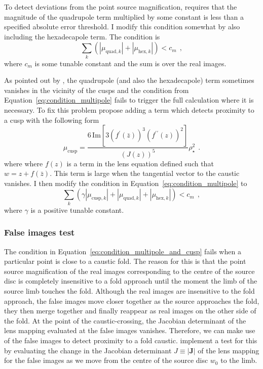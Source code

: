 \documentclass[12pt,dvipsnames]{report}
\renewcommand{\vec}[1]{\boldsymbol{\mathbf{#1}}}
\newcommand{\hquad}{~~}
\begin{document}
To detect deviations from the point source magnification, 
\citet{2018MNRAS.479.5157B} requires that the magnitude of the quadrupole term multiplied 
by some constant is less than a specified absolute error threshold. I modify this condition
somewhat by also including the hexadecapole term. The condition is  
\begin{equation}
    \sum_k\left(|\mu_{\mathrm{quad},k}| + |\mu_{\mathrm{hex},k}| \right)<c_m
    \hquad,
    \label{eq:condition_multipole}
\end{equation}
where $c_m$ is some tunable constant and the sum is over the real images.

As pointed out by \citet{2017MNRAS.468.3993C}, the quadrupole (and also the hexadecapole) 
term sometimes vanishes in the vicinity of the cusps and the condition from  
Equation~\ref{eq:condition_multipole} fails to trigger the full calculation where it is 
necessary. To fix this problem \citet{2017MNRAS.468.3993C} propose adding a term which
detects proximity to a cusp with the following form
\begin{equation}
\mu_\mathrm{cusp}=\frac{6\,\mathrm{Im}\left[3 (f^{\prime }(\bar{z}))^3 (f^{\prime \prime }(z))^2\right]}{(J(z))^5} \rho_\star^{2}
\hquad.
\end{equation}
where where $f(z)$ is a term in the lens equation defined such that $w=z + f(\bar{z})$.
This term is large when the tangential vector to the caustic vanishes.
I then modify the condition in Equation~\ref{eq:condition_multipole} to 
\begin{equation}
    \sum_k\left(\gamma|\mu_{\mathrm{cusp},k}| + |\mu_{\mathrm{quad},k}| + |\mu_{\mathrm{hex},k}| \right)<c_m
    \hquad,
    \label{eq:condition_multipole_and_cusp}
\end{equation}
where $\gamma$ is a positive tunable constant.

\subsubsection{False images test}
The condition in Equation~\ref{eq:condition_multipole_and_cusp}
fails when a particular point is close to a caustic fold. 
The reason for this is that the point source magnification of the real images corresponding 
to the centre of the source disc is completely insensitive to a fold approach until the 
moment the limb of the source limb touches the fold. Although the real images
are insensitive to the fold approach, the false images move closer together as the source 
approaches the fold, they then merge together and finally reappear as real images on the 
other side of the fold. At the point of the caustic-crossing, the Jacobian determinant of 
the lens mapping evaluated at the false images vanishes.
Therefore, we can make use of the false images to detect proximity to a fold caustic. 
\citet{2018MNRAS.479.5157B} implement a test for this by evaluating the change in the 
Jacobian determinant $J\equiv|\vec J|$ of the lens mapping for the false images as
we move from the centre of the source disc $w_0$ to the limb. 
\end{document}
